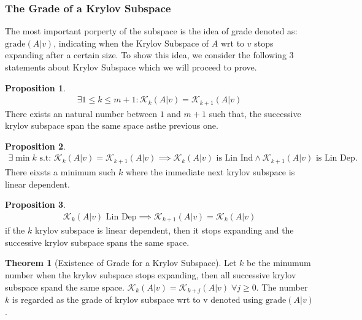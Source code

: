 \documentclass[]{article}
\theoremstyle{definition}
\newtheorem{theorem}{Theorem}
\newtheorem{prop}{Proposition}
\begin{document}
        \subsubsection{The Grade of a Krylov Subspace}
            The most important porperty of the subspace is the idea of grade denoted as: $\text{grade}(A|v)$, indicating when the Krylov Subspace of $A$ wrt to $v$ stops expanding after a certain size. To show this idea, we consider the following 3 statements about Krylov Subspace which we will proceed to prove.
            \begin{prop}
                \begin{align}
                    \exists 1 \le k \le m + 1: \mathcal K_k(A|v) = \mathcal K_{k + 1}(A|v)
                \end{align}
                There exists an natural number between $1$ and $m+ 1$ such that, the successive krylov subspace span the same space asthe previous one. 
            \end{prop} 
            \begin{prop}
                \begin{align}
                    \exists \min k \text{ s.t: }\mathcal K_k(A|v) = \mathcal K_{k + 1}(A|v) \implies 
                    \mathcal K_k(A|v) \text{ is Lin Ind} \wedge \mathcal K_{k + 1}(A|v) \text{ is Lin Dep}. 
                \end{align}
                There eixsts a minimum such $k$ where the immediate next krylov subspace is linear dependent. 
            \end{prop}
            \begin{prop}
                \begin{align}
                    \mathcal K_k(A|v) \text{ Lin Dep} \implies \mathcal K_{k + 1}(A|v) = \mathcal K_k(A|v)
                \end{align}
                if the $k$ krylov subspace is linear dependent, then it stops expanding and the successive krylov subspace spans the same space. 
            \end{prop}
            \begin{theorem}[Existence of Grade for a Krylov Subspace]
                Let $k$ be the minumum number when the krylov subspace stops expanding, then all successive krylov subspace spand the same space. $\mathcal K_k(A|v) = \mathcal K_{k + j}(A|v) \;\forall j \ge 0$. The number $k$ is regarded as the grade of krylov subspace wrt to v denoted using $\text{grade}(A|v)$. 
            \end{theorem}
\end{document}

